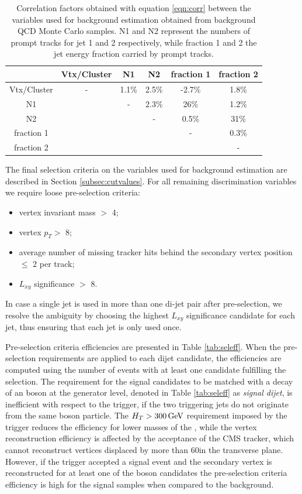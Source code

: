 \begin{table}[htbp]
\centering
\caption{Correlation factors obtained with equation \ref{eqn:corr} between the variables 
used for background estimation obtained from background QCD Monte
Carlo samples. N1 and N2 represent the numbers
of prompt tracks for jet 1 and 2 respectively, while fraction 1 and 2 the jet energy fraction carried by 
prompt tracks.
\label{tab:corr}}
\begin{tabular}{c|ccccc}
 & Vtx/Cluster & N1 & N2 & fraction 1 & fraction 2 \\
\hline
Vtx/Cluster & - & 1.1\% & 2.5\% & -2.7\% & 1.8\%  \\
N1 & & - & 2.3\% & 26\%  & 1.2\% \\
N2 & & & - & 0.5\% & 31\% \\
fraction 1 & & & & - & 0.3\% \\
fraction 2 & & & & & - \\
\end{tabular}
\end{table}

The final selection criteria on the variables used for background estimation are described in Section 
\ref{subsec:cutvalues}. For all remaining discrimination variables we require loose pre-selection criteria:   
\begin{itemize}
 \item vertex invariant mass $>$ 4\GeV;
 \item vertex $p_T>$ 8\GeV;
 \item average number of missing tracker hits behind the secondary vertex position $\leq$ 2 per track;
 \item $L_{xy}$ significance $>$ 8.
\end{itemize}

In case a single jet is used in more than one di-jet pair after pre-selection, we resolve
the ambiguity by choosing the highest $L_{xy}$ significance candidate for each jet, thus ensuring that
each jet is only used once. 

Pre-selection criteria efficiencies are presented in Table \ref{tab:seleff}.  
When the pre-selection requirements are applied to each dijet candidate,
the efficiencies are computed using the number of events with at least one candidate fulfilling the selection.
The requirement for the signal candidates to be matched with a decay of an \X boson at the generator level,
 denoted in Table \ref{tab:seleff} as {\it signal dijet}, 
is inefficient with respect to the trigger, if the two triggering
jets do not originate from the same \X boson particle.  
The $H_T>300\,\text{Ge\hspace{-.08em}V}$ requirement imposed by the trigger reduces the efficiency for lower masses of the \Higgs, 
while the vertex reconstruction efficiency is affected by the acceptance of the CMS tracker, which cannot 
reconstruct vertices displaced by more than 60\cm in the transverse plane. However, if the trigger accepted a signal event and the secondary vertex is reconstructed
for at least one of the \X boson candidates the pre-selection criteria efficiency is high for the signal samples
when compared to the background.   

